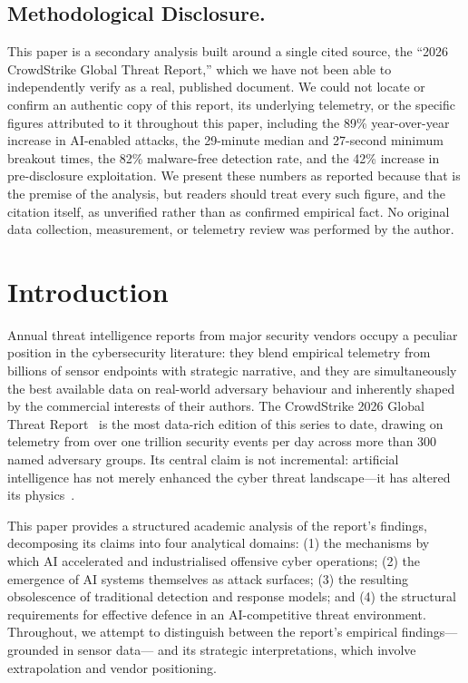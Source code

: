 \documentclass[journal]{IEEEtran}
\begin{document}
\subsection*{Methodological Disclosure.}
This paper is a secondary analysis built around a single cited source, the
``2026 CrowdStrike Global Threat Report,'' which we have not been able to
independently verify as a real, published document. We could not locate or
confirm an authentic copy of this report, its underlying telemetry, or the
specific figures attributed to it throughout this paper, including the
89\% year-over-year increase in AI-enabled attacks, the 29-minute median and
27-second minimum breakout times, the 82\% malware-free detection rate, and
the 42\% increase in pre-disclosure exploitation. We present these numbers
as reported because that is the premise of the analysis, but readers should
treat every such figure, and the citation itself, as unverified rather than
as confirmed empirical fact. No original data collection, measurement, or
telemetry review was performed by the author.

\section{Introduction}

Annual threat intelligence reports from major security vendors occupy a peculiar
position in the cybersecurity literature: they blend empirical telemetry from
billions of sensor endpoints with strategic narrative, and they are simultaneously
the best available data on real-world adversary behaviour and inherently shaped by
the commercial interests of their authors. The CrowdStrike 2026 Global Threat
Report~\cite{cs2026gtr} is the most data-rich edition of this series to date,
drawing on telemetry from over one trillion security events per day across more than
300 named adversary groups. Its central claim is not incremental: artificial
intelligence has not merely enhanced the cyber threat landscape---it has altered its
physics~\cite{cs2026press}.

This paper provides a structured academic analysis of the report's findings,
decomposing its claims into four analytical domains: (1) the mechanisms by which AI
accelerated and industrialised offensive cyber operations; (2) the emergence of AI
systems themselves as attack surfaces; (3) the resulting obsolescence of traditional
detection and response models; and (4) the structural requirements for effective
defence in an AI-competitive threat environment. Throughout, we attempt to
distinguish between the report's empirical findings---grounded in sensor data---
and its strategic interpretations, which involve extrapolation and vendor positioning.
\end{document}
